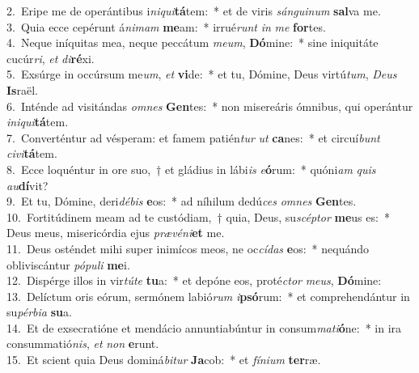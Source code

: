 {2.~}Eripe me de operántibus i\textit{ni}\textit{qui}\textbf{tá}tem:~* et de viris \textit{sán}\textit{gui}\textit{num} \textbf{sal}va me.\\
{3.~}Quia ecce cepérunt á\textit{ni}\textit{mam} \textbf{me}am:~* irrué\textit{runt} \textit{in} \textit{me} \textbf{for}tes.\\
{4.~}Neque iníquitas mea, neque peccátum \textit{me}\textit{um}, \textbf{Dó}mine:~* sine iniquitáte cucúr\textit{ri}, \textit{et} \textit{di}\textbf{ré}xi.\\
{5.~}Exsúrge in occúrsum me\textit{um}, \textit{et} \textbf{vi}de:~* et tu, Dómine, Deus virtú\textit{tum}, \textit{De}\textit{us} \textbf{Is}raël.\\
{6.~}Inténde ad visitándas \textit{om}\textit{nes} \textbf{Gen}tes:~* non misereáris ómnibus, qui operántur \textit{i}\textit{ni}\textit{qui}\textbf{tá}tem.\\
{7.~}Converténtur ad vésperam: et famem patién\textit{tur} \textit{ut} \textbf{ca}nes:~* et circuí\textit{bunt} \textit{ci}\textit{vi}\textbf{tá}tem.\\
{8.~}Ecce loquéntur in ore suo,~† et gládius in lábi\textit{is} \textit{e}\textbf{ó}rum:~* quóni\textit{am} \textit{quis} \textit{au}\textbf{dí}vit?\\
{9.~}Et tu, Dómine, deri\textit{dé}\textit{bis} \textbf{e}os:~* ad níhilum dedú\textit{ces} \textit{om}\textit{nes} \textbf{Gen}tes.\\
{10.~}Fortitúdinem meam ad te custódiam,~† quia, Deus, su\textit{scép}\textit{tor} \textbf{me}us es:~* Deus meus, misericórdia ejus \textit{præ}\textit{vé}\textit{ni}\textbf{et} me.\\
{11.~}Deus osténdet mihi super inimícos meos, ne oc\textit{cí}\textit{das} \textbf{e}os:~* nequándo obliviscántur \textit{pó}\textit{pu}\textit{li} \textbf{me}i.\\
{12.~}Dispérge illos in vir\textit{tú}\textit{te} \textbf{tu}a:~* et depóne eos, proté\textit{ctor} \textit{me}\textit{us}, \textbf{Dó}mine:\\
{13.~}Delíctum oris eórum, sermónem labió\textit{rum} \textit{i}\textbf{psó}rum:~* et comprehendántur in su\textit{pér}\textit{bi}\textit{a} \textbf{su}a.\\
{14.~}Et de exsecratióne et mendácio annuntiabúntur in consum\textit{ma}\textit{ti}\textbf{ó}ne:~* in ira consummatió\textit{nis}, \textit{et} \textit{non} \textbf{e}runt.\\
{15.~}Et scient quia Deus dominá\textit{bi}\textit{tur} \textbf{Ja}cob:~* et \textit{fí}\textit{ni}\textit{um} \textbf{ter}ræ.\\
